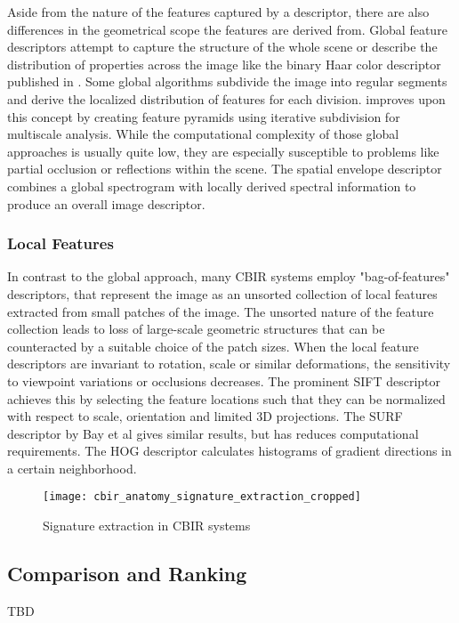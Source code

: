 Aside from the nature of the features captured by a descriptor, there are also
differences in the geometrical scope the features are derived from. Global
feature descriptors attempt to capture the structure of the whole scene or
describe the distribution of properties across the image like the binary Haar
color descriptor published in \autocite{utenpattanant_color_2006}. Some global
algorithms subdivide the image into regular segments and derive the localized
distribution of features for each division. \autocite{lazebnik_beyond_2006}
improves upon this concept by creating feature pyramids using iterative
subdivision for multiscale analysis. While the computational complexity of
those global approaches is usually quite low, they are especially susceptible
to problems like partial occlusion or reflections within the scene. The spatial
envelope descriptor \autocite{oliva_modeling_2001} combines a global
spectrogram with locally derived spectral information to produce an overall
image descriptor.

\subsubsection{Local Features}

In contrast to the global approach, many CBIR systems employ "bag-of-features"
descriptors, that represent the image as an unsorted collection of local
features extracted from small patches of the image. The unsorted nature of the
feature collection leads to loss of large-scale geometric structures that can
be counteracted by a suitable choice of the patch sizes. When the local feature
descriptors are invariant to rotation, scale or similar deformations, the
sensitivity to viewpoint variations or occlusions decreases. The prominent SIFT
descriptor \autocite{lowe_object_1999} achieves this by selecting the feature
locations such that they can be normalized with respect to scale, orientation
and limited 3D projections. The SURF descriptor by Bay et al
\autocite{bay_speeded-up_2008} gives similar results, but has reduces
computational requirements. The HOG descriptor \autocite{dalal_histograms_2005}
calculates histograms of gradient directions in a certain neighborhood.

\begin{figure}[h]
    \centering
        \texttt{[image: cbir\_anatomy\_signature\_extraction\_cropped]}
    \caption{Signature extraction in CBIR systems}
    \label{fig:cbir_signature_extraction}
\end{figure}

\subsection{Comparison and Ranking}\label{sec:anatomy_ranking}

TBD
